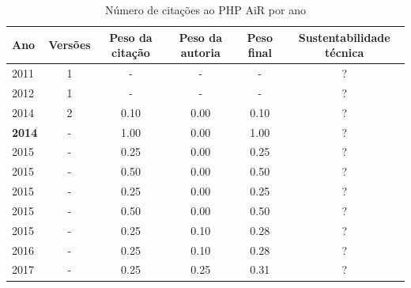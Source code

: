 \begin{table}[H]
\caption{Número de citações ao PHP AiR por ano}
\centering
\begin{tabular}{| l | c | c | c | c | c |}
  \hline
  Ano & Versões & Peso da citação & Peso da autoria & Peso final & Sustentabilidade técnica \\
  \hline
        2011 & 1 & - & - & - & ? \\
\hline
        2012 & 1 & - & - & - & ? \\
\hline
            2014
          &
          2
          &
          0.10
          &
          0.00
          &
            {\color{red} 0.10}
          &
          ?
          \\
            {\bf 2014}
          &
          -
          &
          1.00
          &
          0.00
          &
            {\color{blue} 1.00}
          &
          ?
          \\
\hline
            2015
          &
          -
          &
          0.25
          &
          0.00
          &
            {\color{red} 0.25}
          &
          ?
          \\
            2015
          &
          -
          &
          0.50
          &
          0.00
          &
            {\color{blue} 0.50}
          &
          ?
          \\
            2015
          &
          -
          &
          0.25
          &
          0.00
          &
            {\color{red} 0.25}
          &
          ?
          \\
            2015
          &
          -
          &
          0.50
          &
          0.00
          &
            {\color{blue} 0.50}
          &
          ?
          \\
            2015
          &
          -
          &
          0.25
          &
          0.10
          &
            {\color{red} 0.28}
          &
          ?
          \\
\hline
            2016
          &
          -
          &
          0.25
          &
          0.10
          &
            {\color{red} 0.28}
          &
          ?
          \\
\hline
            2017
          &
          -
          &
          0.25
          &
          0.25
          &
            {\color{red} 0.31}
          &
          ?
          \\
\hline
\end{tabular}
\end{table}



